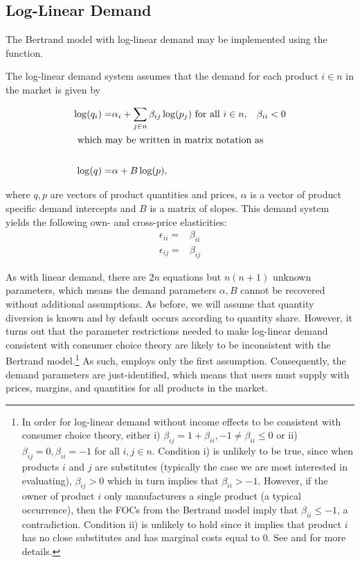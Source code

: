 \documentclass[11pt,numbers=noenddot,pointlessnumbers]{scrreprt}
\numberwithin{equation}{section}
\begin{document}
\subsection{Log-Linear Demand}
The Bertrand model with log-linear demand  may be implemented using the
\verb@loglinear@ function.

The log-linear demand system assumes that the demand for each product $i
\in n$
in the market is given by

\begin{align*}
  \log(q_i)=& \alpha_i + \sum_{j\in n}\beta_{ij}
  \log(p_j) \mbox{ for all $i\in n$},& \beta_{ii}<0\\
  \intertext{ which may be written in matrix notation as }\\
  \log(q)=&\alpha + B\log(p),&
\end{align*}


where $q,p$ are vectors of product quantities and prices, $\alpha$ is a vector of product specific demand intercepts and
$B$ is a matrix of slopes. This demand system yields the following
own- and cross-price elasticities:
\begin{align*}
  \epsilon_{ii}=&\beta_{ii} \\
  \epsilon_{ij}=&\beta_{ij}
\end{align*}


As with linear demand, there are $2n$ equations
but $n(n+1)$ unknown parameters, which means the demand parameters
$\alpha,B$ cannot be recovered without additional assumptions. As
before, we will assume that quantity diversion is known and by default occurs
according to quantity share. However, it turns out that the parameter
restrictions needed to make log-linear demand consistent with consumer
choice theory are likely to be inconsistent with the Bertrand model.\footnote{In
  order for log-linear demand without income effects to be consistent with consumer choice
  theory, either i) $\beta_{ij}=1+\beta_{ii},-1\ne\beta_{ii}\le 0$ or
  ii) $\beta_{ij}=0,\beta_{ii}=-1$ for all $i,j \in n$. Condition i) is unlikely
  to be true, since when products $i$ and
  $j$ are substitutes (typically the case we are most interested in
  evaluating), $\beta_{ij}> 0$ which in turn implies that
  $\beta_{ii}>-1$. However, if the owner of product $i$ only manufacturers a
  single product (a typical occurrence), then the FOCs from the Bertrand model imply that
  $\beta_{ii}\le-1$, a contradiction. Condition ii) is unlikely to hold since it
  implies that product $i$ has no close substitutes and has marginal
  costs equal to 0. See
  \cite{LaFrance1986} and \cite{Haefen2002} for more details.} As
such, \verb@loglinear@ employs only the first assumption. Consequently,
the demand parameters are just-identified, which means that users
must supply \verb@loglinear@ with prices, margins, and quantities for all
products in the market.
\end{document}
